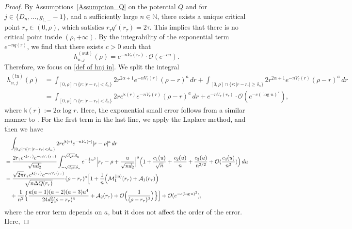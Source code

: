 \documentclass[reqno]{amsart}
\newcommand{\1}{\mathds{1}}
\newcommand{\N}{\mathbb{N}}
\numberwithin{equation}{section}
\theoremstyle{definition}
\begin{document}
\begin{proof}
By Assumptions~\ref{Assumption_Q} on the potential $Q$ and for $j\in\{D_n,\dots,g_{1,-}-1\}$, and a sufficiently large $n\in\N$, there exists a unique critical point $r_{\tau}\in(0,\rho)$, which satisfies $r_{\tau}q'(r_{\tau})=2\tau$. 
This implies that there is no critical point inside $(\rho,+\infty)$. 
By the integrability of the exponential term $e^{-nq(r)}$, 
we find that there exists $c>0$ such that 
\begin{equation}
    h_{n,j}^{(\mathrm{out})}(\rho)=e^{-nV_{\tau}(r_{\tau})}\cdot \mathcal{O}(e^{-cn}). 
\end{equation}
Therefore, we focus on \eqref{def of hnj in}. We split the integral
\begin{align*}
h_{n,j}^{(\mathrm{in})}(\rho)
&=
\int_{[0,\rho]\cap \{r:|r-r_{\tau}|<\delta_n\}}2r^{2\alpha+1}e^{-nV_{\tau}(r)}(\rho-r)^{a}\,dr
+
\int_{[0,\rho]\cap \{r:|r-r_{\tau}|\geq \delta_n\}}2r^{2\alpha+1}e^{-nV_{\tau}(r)}(\rho-r)^{a}\,dr
\\
&=
\int_{[0,\rho]\cap \{r:|r-r_{\tau}|<\delta_n\}}2r e^{\mathsf{k}(r)}e^{-nV_{\tau}(r)}(\rho-r)^{a}\,dr
+
e^{-nV_{\tau}(r_{\tau})}\cdot \mathcal{O}(e^{-c(\log n)^2}), 
\end{align*}
where $\mathsf{k}(r):=2\alpha\log r$.
Here, the exponential small error follows from a similar manner to \cite[Proof of Lemma 2.1]{BKS2023}.
For the first term in the last line, we apply the Laplace method, and then we have 
\begin{align*}
&\quad
\int_{[0,\rho]\cap \{r:|r-r_{\tau}|<\delta_n\}}2r e^{\mathsf{k}(r)}e^{-nV_{\tau}(r)}|r-\rho|^{a}\,dr
\\
&=
\frac{2r_{\tau}e^{\mathsf{k}(r_{\tau})}e^{-nV_{\tau}(r_{\tau})}}{\sqrt{nd_2}}\int_{-\sqrt{d_2n}\delta_n}^{\sqrt{d_2n}\delta_n}
e^{-\frac{1}{2}u^2}
\Bigl|r_{\tau}-\rho+\frac{u}{\sqrt{nd_2}}\Bigr|^{a}
\Bigl( 
1+\frac{c_1(u)}{\sqrt{n}}+\frac{c_2(u)}{n}+\frac{c_3(u)}{n^{3/2}}+\mathcal{O}(\frac{c_4(u)}{n^2})
\Bigr)\,du
\\
&=
\frac{\sqrt{2\pi}r_{\tau}e^{\mathsf{k}(r_{\tau})}e^{-nV_{\tau}(r_{\tau})}}{\sqrt{n\Delta Q(r_{\tau})}}
(\rho-r_{\tau})^a
\Bigl[
1+\frac{1}{n}\Bigl(\mathcal{M}_1^{(\rm in)}(r_{\tau})+\mathcal{A}_1(r_{\tau})\Bigr)
\\
&\quad
+\frac{1}{n^2}
\Bigl\{
\frac{a(a-1)(a-2)(a-3)u^4}{24d_2^2(\rho-r_{\tau})^4}
+\mathcal{A}_2(r_{\tau})
+\mathcal{O}\Bigl(\frac{1}{(\rho-r_{\tau})^3}\Bigr)
\Bigr\}
\Bigr]
+
\mathcal{O}(e^{-c(\log n)^2}), 
\end{align*}
where the error term depends on $a$, but it does not affect the order of the error. Here, 

\end{proof}
\end{document}
